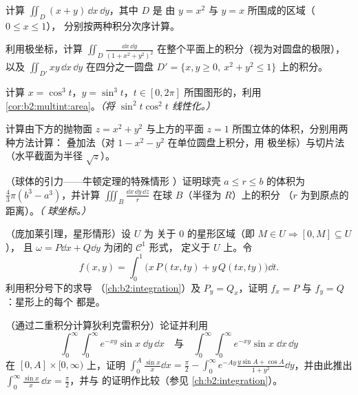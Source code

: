 \begin{exercise}[$\star$]\label{exo:b2:multint:3}
计算 $\iint_D (x + y)\,\dd x\,\dd y$，其中 $D$ 是
由 $y = x^2$ 与 $y = x$ 所围成的区域（$0 \leq x \leq 1$），
分别按两种积分次序计算。
\end{exercise}

\begin{exercise}[$\star\star$]\label{exo:b2:multint:4}
利用极坐标，计算 $\iint_D \frac{\dd x\,\dd y}{(1 +
x^2 + y^2)^2}$ 在整个平面上的积分（视为对圆盘的极限），以及
$\iint_{D'} xy\,\dd x\,\dd y$ 在四分之一圆盘 $D' = \{x, y
\geq 0,\ x^2 + y^2 \leq 1\}$ 上的积分。
\end{exercise}

\begin{exercise}[$\star\star$]\label{exo:b2:multint:5}
计算 $x = \cos^3 t$，$y =
\sin^3 t$，$t \in [0, 2\pi]$ 所围图形的，利用
\cref{cor:b2:multint:area}。\emph{（将 $\sin^2 t\cos^2 t$ 线性化。）}
\end{exercise}

\begin{exercise}[$\star\star$]\label{exo:b2:multint:6}
计算由下方的抛物面 $z
= x^2 + y^2$ 与上方的平面 $z = 1$ 所围立体的体积，分别用两种方法计算：
叠加法（对 $1 - x^2 - y^2$ 在单位圆盘上积分，用
极坐标）与切片法（水平截面为半径
$\sqrt z$）。
\end{exercise}

\begin{exercise}[$\star\star$]\label{exo:b2:multint:7}
（球体的引力——牛顿定理的特殊情形
）证明球壳 $a \leq r \leq
b$ 的体积为 $\frac43\pi(b^3 - a^3)$，并计算 $\iiint_{B}
\frac{\dd x\,\dd y\,\dd z}{r}$ 在球 $B$（半径为 $R$）上的积分
（$r$ 为到原点的距离）。\emph{（
球坐标。）}
\end{exercise}

\begin{exercise}[$\star\star\star$]\label{exo:b2:multint:8}
（庞加莱引理，星形情形）设 $U$ 为
关于 $0$ 的星形区域（即 $M \in U \Rightarrow [0, M] \subseteq U$），
且 $\omega = P\dd x + Q\dd y$ 为闭的 $\mathcal{C}^1$ 形式，
定义于 $U$ 上。令
\[
f(x, y) = \int_0^1 \bigl(x\,P(tx, ty) + y\,Q(tx, ty)\bigr)\dd t .
\]
利用积分号下的求导
（\cref{ch:b2:integration}）及 $P_y = Q_x$，证明 $f_x = P$
与 $f_y = Q$：星形上的每个
都是。
\end{exercise}

\begin{exercise}[$\star\star\star$]\label{exo:b2:multint:9}
（通过二重积分计算狄利克雷积分）论证并利用
\[
\int_0^\infty\!\!\int_0^\infty e^{-xy}\sin x\;\dd y\,\dd x
\quad\text{与}\quad
\int_0^\infty\!\!\int_0^\infty e^{-xy}\sin x\;\dd x\,\dd y
\]
在 $[0, A] \times [0, \infty)$ 上，证明 $\int_0^A \frac{\sin
x}{x}\dd x = \frac\pi2 - \int_0^\infty
e^{-Ay}\frac{y\sin A + \cos A}{1 + y^2}\dd y$，并由此推出
$\int_0^\infty \frac{\sin x}{x}\,\dd x = \frac\pi2$，并与
的证明作比较（参见
\cref{ch:b2:integration}）。
\end{exercise}

